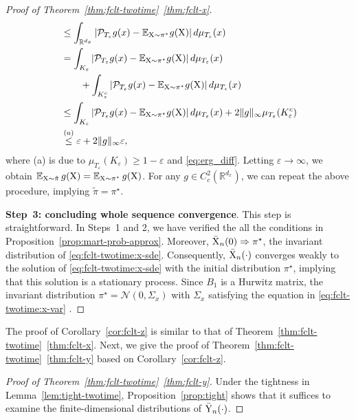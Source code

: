 \documentclass[11pt]{article}
\theoremstyle{plain}
\theoremstyle{definition}
\def\eps{{\varepsilon}}
\def\ermX{{\textnormal{X}}}
\def\NM{{\mathcal N}}
\def\PM{{\mathcal P}}
\def\RB{{\mathbb R}}
\def\EB{{\mathbb E}}
\newcommand{\xbar}{{\bar{\textnormal{X}}}}
\newcommand{\ybar}{{\bar{\textnormal{Y}}}}
\newcommand{\xx}{{x}}
\def\weakconverge{\Rightarrow}
\begin{document}
\begin{appendix}
\begin{proof}[Proof of Theorem~\ref{thm:fclt-twotime}~\ref{thm:fclt-x}]
\begin{equation*}
\begin{aligned}
            & \le \int_{\RB^{d_x}} \left| \PM_{T_\eps} g(\xx) -\EB_{\ermX \sim \pi^\star} g(\ermX) \right| d \mu_{T_\eps}(\xx)\\ 
            & = \int_{K_\eps} \left| \PM_{T_\eps} g(\xx) - \EB_{\ermX \sim \pi^\star} g(\ermX) \right| d \mu_{T_\eps}(\xx) \\
            & \qquad + \int_{K_\eps^c} \left| \PM_{T_\eps} g(\xx) - \EB_{\ermX \sim \pi^\star} g(\ermX) \right| d \mu_{T_\eps}(\xx) \\
            &\le \int_{K_\eps} \left| \PM_{T_\eps} g(\xx) - \EB_{\ermX \sim \pi^\star} g(\ermX) \right| d \mu_{T_\eps}(\xx) + 2 \|g\|_\infty \mu_{T_\eps} (K_\eps^c) \\ 
            & \overset{(a)}{\le} \eps + 2\|g\|_\infty \eps,
        \end{aligned}
    \end{equation*}
    where (a) is due to $\mu_{T_\eps}(K_\eps) \ge 1-\eps$ and \eqref{eq:erg_diff}.
    Letting $\eps \to \infty$, we obtain $\EB_{\ermX \sim \tilde\pi}\, g(\ermX) = \EB_{\ermX \sim \pi^\star}\, g(\ermX) $.
    For any $g \in C_c^2(\RB^{d_x})$, we can repeat the above procedure, implying $\tilde\pi = \pi^\star$.
    \vspace{0.2cm}
    
    \textbf{Step~3: concluding whole sequence convergence}. This step is straightforward.
    In Steps~1 and 2, we have verified the all the conditions in Proposition~\ref{prop:mart-prob-approx}.
    Moreover, $\xbar_{n}(0)  \weakconverge \pi^\star$, the invariant distribution of \eqref{eq:fclt-twotime:x-sde}.
    Consequently, $\xbar_{n}(\cdot)$ converges weakly to the solution of \eqref{eq:fclt-twotime:x-sde} with the initial distribution $\pi^\star$, implying that this solution is a stationary process.
    Since $B_1$ is a Hurwitz matrix, the invariant distribution $\pi^\star=\NM(0, \Sigma_{x})$ with $\Sigma_x$ satisfying the equation in \eqref{eq:fclt-twotime:x-var} \cite[Section~6.5]{risken1996fokker}.
\end{proof}

The proof of Corollary~\ref{cor:fclt-z} is similar to that of Theorem~\ref{thm:fclt-twotime}~\ref{thm:fclt-x}.
Next, we give the proof of Theorem~\ref{thm:fclt-twotime}~\ref{thm:fclt-y} based on Corollary~\ref{cor:fclt-z}.

\begin{proof}[Proof of Theorem~\ref{thm:fclt-twotime}~\ref{thm:fclt-y}]
    Under the tightness in Lemma~\ref{lem:tight-twotime}, 
    Proposition~\ref{prop:tight} shows that it suffices to examine the finite-dimensional distributions of $\ybar_{n}(\cdot)$.
    

\end{proof}
\end{appendix}
\end{document}
